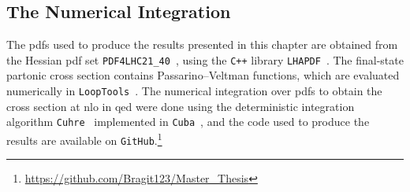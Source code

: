 

\subsection{The Numerical Integration}
The \glspl{pdf} used to produce the results presented in this chapter are obtained from the Hessian \gls{pdf} set \texttt{PDF4LHC21\_40}~\cite{PDF4LHCWorkingGroup:2022cjn}, using the \texttt{C++} library \texttt{LHAPDF}~\cite{Buckley:2014ana}.
The final-state partonic cross section contains Passarino--Veltman functions, which are evaluated numerically in \texttt{LoopTools}~\cite{Hahn:1998yk}.
The numerical integration over \glspl{pdf} to obtain the cross section at \gls{nlo} in \gls{qed} were done using the deterministic integration algorithm \texttt{Cuhre}~\cite{Berntsen:1991ciy} implemented in \texttt{Cuba}~\cite{Hahn:2004fe,Hahn:2014fua}, and the code used to produce the results are available on \texttt{GitHub}.\footnote{\url{https://github.com/Bragit123/Master_Thesis}}

